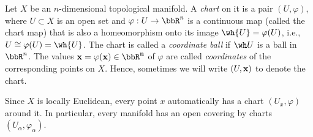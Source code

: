 \begin{defn}[Charts]
    Let $X$ be an $n$-dimensional topological manifold. A \emph{chart} on it is a pair $(U,\varphi)$, where $U\subset X$ is an open set and $\varphi:U\to \bbR^n$ is a continuous map (called the chart map) that is also a homeomorphism onto its image $\wh{U}=\varphi (U)$, i.e., $U\cong \varphi(U)=\wh{U}$. The chart is called a \emph{coordinate ball} if $\wh U$ is a ball in $\bbR^n$. The values $\bf{x}=\varphi(x)\in\bbR^n$ of $\varphi$ are called \emph{coordinates} of the corresponding points on $X$. Hence, sometimes we will write $(U,\bf{x})$ to denote the chart.
\end{defn}
\begin{rem}
    Since $X$ is locally Euclidean, every point $x$ automatically has a chart $(U_x,\varphi)$ around it. In particular, every manifold has an open covering by charts $(U_\alpha,\varphi_\alpha)$.
\end{rem}

